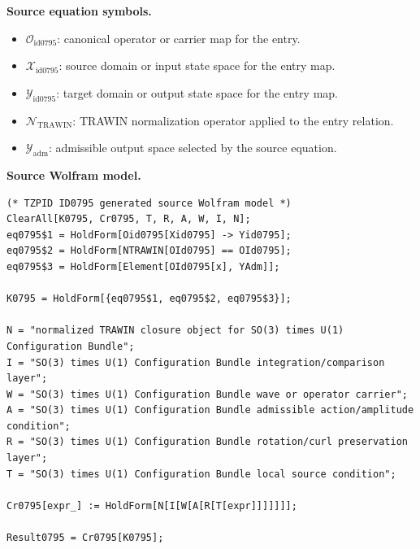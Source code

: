 \begin{minipage}[t]{0.49\linewidth}
\begingroup
\small
\raggedright
\textbf{Source equation symbols.}\par
\begin{itemize}[leftmargin=1.35em,itemsep=1pt,topsep=1pt,parsep=0pt]
    \item $\mathcal{O}_{\mathrm{id0795}}$: canonical operator or carrier map for the entry.
    \item $\mathcal{X}_{\mathrm{id0795}}$: source domain or input state space for the entry map.
    \item $\mathcal{Y}_{\mathrm{id0795}}$: target domain or output state space for the entry map.
    \item $\mathcal{N}_{\mathrm{TRAWIN}}$: TRAWIN normalization operator applied to the entry relation.
    \item $\mathcal{Y}_{\mathrm{adm}}$: admissible output space selected by the source equation.
\end{itemize}
\endgroup
\end{minipage}\hfill
\begin{minipage}[t]{0.47\linewidth}
\begingroup
\scriptsize
\raggedright
\textbf{Source Wolfram model.}\par
\begin{Verbatim}[fontsize=\tiny,breaklines=true,breakanywhere=true]
(* TZPID ID0795 generated source Wolfram model *)
ClearAll[K0795, Cr0795, T, R, A, W, I, N];
eq0795$1 = HoldForm[Oid0795[Xid0795] -> Yid0795];
eq0795$2 = HoldForm[NTRAWIN[OId0795] == OId0795];
eq0795$3 = HoldForm[Element[OId0795[x], YAdm]];

K0795 = HoldForm[{eq0795$1, eq0795$2, eq0795$3}];

N = "normalized TRAWIN closure object for SO(3) times U(1) Configuration Bundle";
I = "SO(3) times U(1) Configuration Bundle integration/comparison layer";
W = "SO(3) times U(1) Configuration Bundle wave or operator carrier";
A = "SO(3) times U(1) Configuration Bundle admissible action/amplitude condition";
R = "SO(3) times U(1) Configuration Bundle rotation/curl preservation layer";
T = "SO(3) times U(1) Configuration Bundle local source condition";

Cr0795[expr_] := HoldForm[N[I[W[A[R[T[expr]]]]]]];

Result0795 = Cr0795[K0795];
\end{Verbatim}
\endgroup
\end{minipage}


